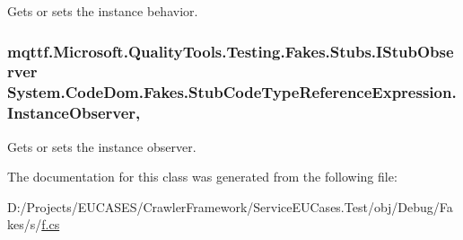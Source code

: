 Gets or sets the instance behavior.

\hypertarget{class_system_1_1_code_dom_1_1_fakes_1_1_stub_code_type_reference_expression_ac84ce4951f75e4a1f60ec55fab15b6dd}{
\subsubsection[{Instance\-Observer}]{\setlength{\rightskip}{0pt plus 5cm}mqttf.\-Microsoft.\-Quality\-Tools.\-Testing.\-Fakes.\-Stubs.\-I\-Stub\-Observer System.\-Code\-Dom.\-Fakes.\-Stub\-Code\-Type\-Reference\-Expression.\-Instance\-Observer\hspace{0.3cm}{\ttfamily [get]}, {\ttfamily [set]}}}\label{class_system_1_1_code_dom_1_1_fakes_1_1_stub_code_type_reference_expression_ac84ce4951f75e4a1f60ec55fab15b6dd}


Gets or sets the instance observer.



The documentation for this class was generated from the following file\-:\begin{DoxyCompactItemize}
\item 
D\-:/\-Projects/\-E\-U\-C\-A\-S\-E\-S/\-Crawler\-Framework/\-Service\-E\-U\-Cases.\-Test/obj/\-Debug/\-Fakes/s/\hyperlink{s_2f_8cs}{f.\-cs}\end{DoxyCompactItemize}
